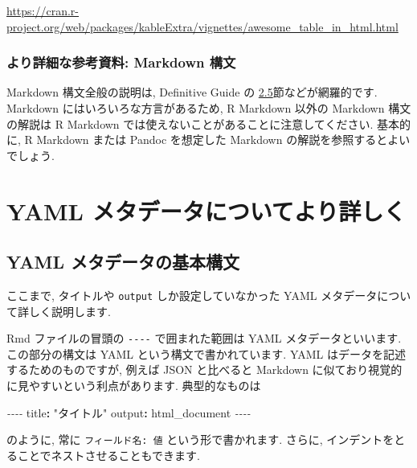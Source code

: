 \documentclass[
]{ltjsarticle}
\newenvironment{Shaded}{\begin{snugshade}}{\end{snugshade}}
\newcommand{\AttributeTok}[1]{\textcolor[rgb]{0.77,0.63,0.00}{#1}}
\newcommand{\FunctionTok}[1]{\textcolor[rgb]{0.00,0.00,0.00}{#1}}
\newcommand{\KeywordTok}[1]{\textcolor[rgb]{0.13,0.29,0.53}{\textbf{#1}}}
\newcommand{\PreprocessorTok}[1]{\textcolor[rgb]{0.56,0.35,0.01}{\textit{#1}}}
\newcommand{\StringTok}[1]{\textcolor[rgb]{0.31,0.60,0.02}{#1}}
\begin{document}
\url{https://cran.r-project.org/web/packages/kableExtra/vignettes/awesome_table_in_html.html}

\hypertarget{ux3088ux308aux8a73ux7d30ux306aux53c2ux8003ux8cc7ux6599-markdown-ux69cbux6587}{%
\subsubsection{より詳細な参考資料: Markdown 構文}\label{ux3088ux308aux8a73ux7d30ux306aux53c2ux8003ux8cc7ux6599-markdown-ux69cbux6587}}

Markdown 構文全般の説明は, Definitive Guide の \href{https://bookdown.org/yihui/rmarkdown/markdown-syntax.html}{2.5}節などが網羅的です. Markdown にはいろいろな方言があるため, R Markdown 以外の Markdown 構文の解説は R Markdown では使えないことがあることに注意してください. 基本的に, R Markdown または Pandoc を想定した Markdown の解説を参照するとよいでしょう.

\hypertarget{YAML}{%
\section{YAML メタデータについてより詳しく}\label{YAML}}

\hypertarget{yaml-ux30e1ux30bfux30c7ux30fcux30bfux306eux57faux672cux69cbux6587}{%
\subsection{YAML メタデータの基本構文}\label{yaml-ux30e1ux30bfux30c7ux30fcux30bfux306eux57faux672cux69cbux6587}}

ここまで, タイトルや \texttt{output} しか設定していなかった YAML メタデータについて詳しく説明します.

Rmd ファイルの冒頭の \texttt{-\/-\/-\/-} で囲まれた範囲は YAML メタデータといいます. この部分の構文は YAML という構文で書かれています. YAML はデータを記述するためのものですが, 例えば JSON と比べると Markdown に似ており視覚的に見やすいという利点があります. 典型的なものは

\begin{Shaded}
\begin{Highlighting}[]
\PreprocessorTok{{-}{-}{-}{-}}
\FunctionTok{title}\KeywordTok{:}\AttributeTok{ }\StringTok{"タイトル"}
\FunctionTok{output}\KeywordTok{:}\AttributeTok{ html\_document}
\PreprocessorTok{{-}{-}{-}{-}}
\end{Highlighting}
\end{Shaded}

のように, 常に \texttt{フィールド名:\ 値} という形で書かれます. さらに, インデントをとることでネストさせることもできます.
\end{document}

